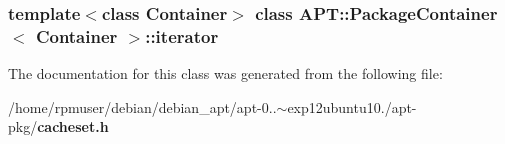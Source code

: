\subsubsection*{template$<$class \-Container$>$ class A\-P\-T\-::\-Package\-Container$<$ Container $>$\-::iterator}



\-The documentation for this class was generated from the following file\-:\begin{DoxyCompactItemize}
\item 
/home/rpmuser/debian/debian\-\_\-apt/apt-\/0..$\sim$exp12ubuntu10./apt-\/pkg/{\bf cacheset.\-h}\end{DoxyCompactItemize}

